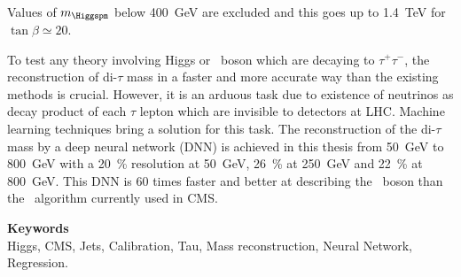 Values of $m_{\Higgspm}$ below \SI{400}{\GeV} are excluded
and this goes up to 
\SI{1.4}{\TeV} for $\tan\beta\simeq\num{20}$.
\par
To test any theory involving Higgs or \Zboson\ boson which are decaying to $\tau^+ \tau^-$,
the reconstruction of di-$\tau$ mass in a faster and more accurate way than the existing methods is crucial. 
However, it is an arduous task due to existence of neutrinos as decay product of each $\tau$ lepton which are invisible to detectors at LHC. 
Machine learning techniques bring a solution for this task. 
The reconstruction of the di-$\tau$ mass by a deep neural network (DNN)
is achieved in this thesis
from 
\SI{50}{\GeV} to \SI{800}{\GeV}
with a
\SI{20}{\%} resolution at \SI{50}{\GeV},
\SI{26}{\%} at \SI{250}{\GeV} and
\SI{22}{\%} at \SI{800}{\GeV}.
This DNN is
60 times faster
and
better at describing the \Zboson~boson
than the \SVFIT\ algorithm currently used in CMS.

\vfill

\noindent\textbf{\Large\sffamily Keywords}\\
Higgs,
CMS,
Jets,
Calibration,
Tau,
Mass reconstruction,
Neural Network,
Regression.

\vspace{2\baselineskip}